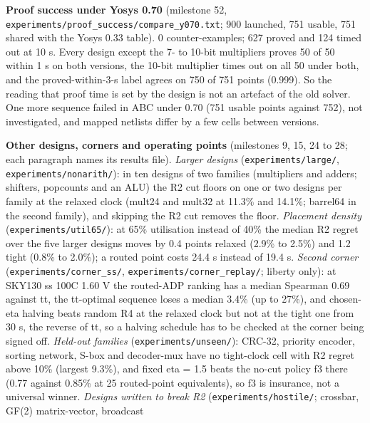 \documentclass[conference]{IEEEtran}
\begin{document}
\textbf{Proof success under Yosys 0.70} (milestone 52,
\texttt{experiments/\allowbreak{}proof\_\allowbreak{}success/\allowbreak{}compare\_\allowbreak{}y070.txt}; 900 launched, 751
usable, 751 shared with the Yosys 0.33 table). 0 counter-examples; 627
proved and 124 timed out at 10 s. Every design except the 7- to 10-bit
multipliers proves 50 of 50 within 1 s on both versions, the 10-bit
multiplier times out on all 50 under both, and the proved-within-3-s
label agrees on 750 of 751 points (0.999). So the reading that proof
time is set by the design is not an artefact of the old solver. One more
sequence failed in ABC under 0.70 (751 usable points against 752), not
investigated, and mapped netlists differ by a few cells between
versions.

\textbf{Other designs, corners and operating points} (milestones 9, 15,
24 to 28; each paragraph names its results file). \emph{Larger designs}
(\texttt{experiments/\allowbreak{}large/\allowbreak{}}, \texttt{experiments/\allowbreak{}nonarith/\allowbreak{}}): in ten
designs of two families (multipliers and adders; shifters, popcounts and
an ALU) the R2 cut floors on one or two designs per family at the
relaxed clock (mult24 and mult32 at 11.3\% and 14.1\%; barrel64 in the
second family), and skipping the R2 cut removes the floor.
\emph{Placement density} (\texttt{experiments/\allowbreak{}util65/\allowbreak{}}): at 65\%
utilisation instead of 40\% the median R2 regret over the five larger
designs moves by 0.4 points relaxed (2.9\% to 2.5\%) and 1.2 tight
(0.8\% to 2.0\%); a routed point costs 24.4 s instead of 19.4 s.
\emph{Second corner} (\texttt{experiments/\allowbreak{}corner\_\allowbreak{}ss/\allowbreak{}},
\texttt{experiments/\allowbreak{}corner\_\allowbreak{}replay/\allowbreak{}}; liberty only): at SKY130 ss 100C
1.60 V the routed-ADP ranking has a median Spearman 0.69 against tt, the
tt-optimal sequence loses a median 3.4\% (up to 27\%), and chosen-eta
halving beats random R4 at the relaxed clock but not at the tight one
from 30 s, the reverse of tt, so a halving schedule has to be checked at
the corner being signed off. \emph{Held-out families}
(\texttt{experiments/\allowbreak{}unseen/\allowbreak{}}): CRC-32, priority encoder, sorting
network, S-box and decoder-mux have no tight-clock cell with R2 regret
above 10\% (largest 9.3\%), and fixed eta = 1.5 beats the no-cut policy
f3 there (0.77 against 0.85\% at 25 routed-point equivalents), so f3 is
insurance, not a universal winner. \emph{Designs written to break R2}
(\texttt{experiments/\allowbreak{}hostile/\allowbreak{}}; crossbar, GF(2) matrix-vector, broadcast
\end{document}
